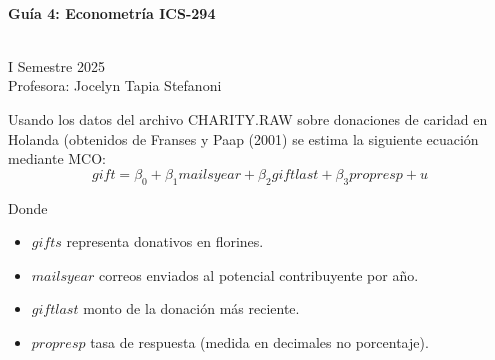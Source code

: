 \documentclass[10pt,a4paper]{article}
\begin{document}
\vspace{5cm}



\begin{center}
\begin{large}
\textbf{\\Guía 4: Econometría ICS-294}
\end{large}\\
\vspace{0.2cm}
I Semestre 2025\\
Profesora: Jocelyn Tapia Stefanoni\\
\end{center}


Usando los datos del archivo CHARITY.RAW  sobre donaciones de caridad en Holanda (obtenidos de Franses y Paap (2001) se estima la siguiente ecuación mediante MCO:
$$gift =\beta_0+\beta_1 mailsyear + \beta_2 giftlast +\beta_3 propresp +u$$

Donde
\begin{itemize}
    \item $gifts$ representa  donativos en florines. 
    \item $mailsyear$ correos enviados al potencial contribuyente por año.
\item $giftlast$ monto de la donación más reciente.
    \item $propresp$ tasa de respuesta (medida en decimales no porcentaje).
\end{itemize}
\end{document}

